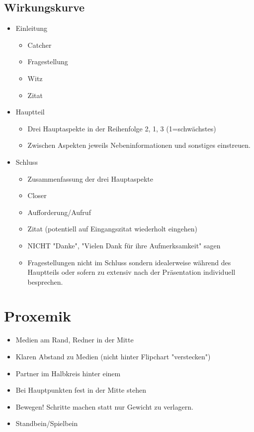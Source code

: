 \documentclass[../main.tex]{subfiles}
\begin{document}
        \subsection{Wirkungskurve}
        	\label{section:Seminar:RhetorikI:Wirkungskurve}
        	\begin{itemize}
        		\item Einleitung
        		\begin{itemize}
        			\item Catcher
        			\item Fragestellung
        			\item Witz
        			\item Zitat
        		\end{itemize}
        		\item Hauptteil
        		\begin{itemize}
        			\item Drei Hauptaspekte in der Reihenfolge 2, 1, 3 (1=schwächstes)
        			\item Zwischen Aspekten jeweils Nebeninformationen und sonstiges einstreuen.
        		\end{itemize}
        		\item Schluss
        		\begin{itemize}
        			\item Zusammenfassung der drei Hauptaspekte
        			\item Closer
        			\item Aufforderung/Aufruf
        			\item Zitat (potentiell auf Eingangszitat wiederholt eingehen)
        			\item NICHT "Danke", "Vielen Dank für ihre Aufmerksamkeit" sagen
        			\item Fragestellungen nicht im Schluss sondern idealerweise während des Hauptteils oder sofern zu extensiv nach der Präsentation individuell besprechen. 
        		\end{itemize}
        	\end{itemize}
                        
    \section{Proxemik}
    	\begin{itemize}
    		\item Medien am Rand, Redner in der Mitte
    		\item Klaren Abstand zu Medien (nicht hinter Flipchart "verstecken")
    		\item Partner im Halbkreis hinter einem
    		\item Bei Hauptpunkten fest in der Mitte stehen 
    		\item Bewegen! Schritte machen statt nur Gewicht zu verlagern.
    		\item Standbein/Spielbein
    	\end{itemize}
    
\end{document}
